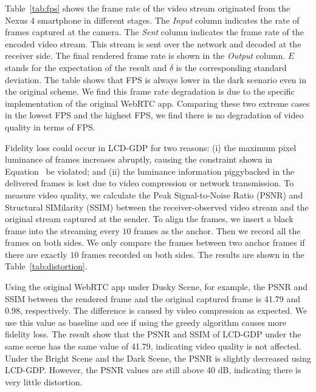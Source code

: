 Table~\ref{tab:fps} shows the frame rate of the video stream originated from the Nexus 4 smartphone 
in different stages. The {\it Input} column indicates the rate of frames captured at the camera. 
The {\it Sent} column indicates the frame rate of the encoded video stream.
This stream is sent over the network and decoded at the receiver side.
The final rendered frame rate is shown in the {\it Output} column. 
$E$ stands for the
expectation of the result and $\delta$ is the corresponding standard
deviation. The table shows that FPS is always lower in the dark scenario
even in the original scheme. We find this frame rate degradation
is due to the specific implementation of the original WebRTC app. Comparing these two
extreme cases in the lowest FPS and the highest FPS,  we find there is no degradation of video quality in terms of FPS.

Fidelity loss could occur in LCD-GDP for two reasons: (i) the maximum pixel luminance of 
frames increases abruptly, causing the constraint shown in Equation~\cite{eq:distort} be violated;
and (ii) the luminance information piggybacked in the delivered frames is lost due to video
compression or network transmission.
To measure video quality, we calculate the Peak
Signal-to-Noise Ratio (PSNR) and Structural SIMilarity (SSIM) 
between the receiver-observed video stream and the original stream captured at the sender. 
To align the frames, we insert a black frame into the streaming every $10$ 
frames as the anchor. Then we record all the frames on both sides. 
We only compare the frames between two anchor frames if there 
are exactly $10$ frames recorded on both sides. 
The results are shown in the Table~\ref{tab:distortion}.

Using the original WebRTC app under Dusky Scene, for example, the PSNR and SSIM between 
the rendered frame and the original captured frame is 41.79 and 0.98, respectively. 
The difference is caused by video compression as expected. We use this value as baseline
and see if using the greedy algorithm causes more fidelity loss. 
The result show that the PSNR and SSIM of LCD-GDP under the same scene has the same
value of 41.79, indicating video quality is not affected.
Under the Bright Scene and the Dark Scene, the PSNR is slightly decreased using LCD-GDP.
However, the PSNR values are still above 40 dB, indicating there is very little distortion.

